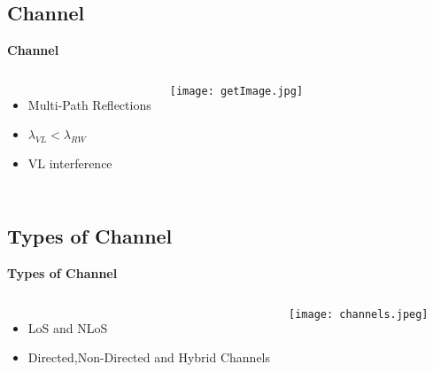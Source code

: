 \documentclass[9pt, dvipsnames]{beamer} %
\begin{document}
\subsection{Channel} 
  
  \begin{frame}{\textbf {Channel}}
           \begin{columns}
          
             \begin{itemize}
              \item Multi-Path Reflections 
              \item $\lambda_{VL}<\lambda_{RW} $
              \item VL interference
             \end{itemize}
           \texttt{[image: getImage.jpg]}
          \end{columns}
   \end{frame}

\subsection{Types of Channel}

  
  \begin{frame}{\textbf {Types of Channel}}
           \begin{columns}
          
             \begin{itemize}
              \item LoS and NLoS 
              \item Directed,Non-Directed and Hybrid Channels
             \end{itemize}
           \texttt{[image: channels.jpeg]}
          \end{columns}
   \end{frame}
   
\end{document}
